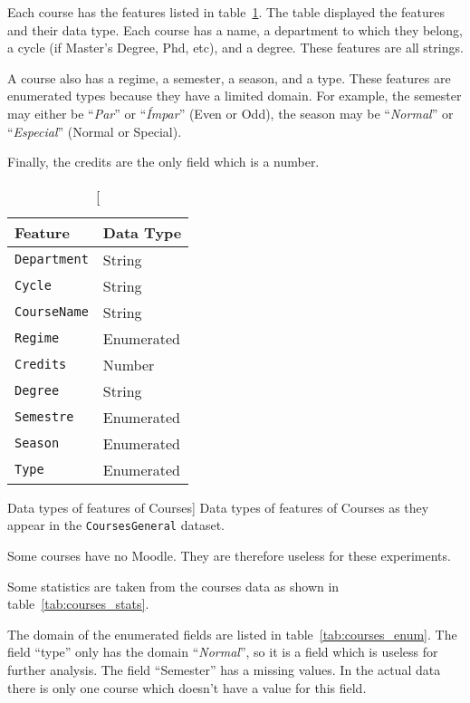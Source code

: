 Each course has the features listed in
table~\ref{tab:courses_general_features}. The table displayed the features and
their data type. Each course has a name, a department to which they belong, a
cycle (if Master's Degree, Phd, etc), and a degree. These features are all
strings.

A course also has a regime, a semester, a season, and a type. These features
are enumerated types because they have a limited domain. For example, the
semester may either be ``\textit{Par}'' or ``\textit{Ímpar}'' (Even or Odd),
the season may be ``\textit{Normal}'' or ``\textit{Especial}'' (Normal or
Special).

Finally, the credits are the only field which is a number.

\begin{table}[h!]
    \centering

    \begin{tabular}{l l}
        Feature             & Data Type  \\ \hline
        \texttt{Department} & String     \\
        \texttt{Cycle}      & String     \\
        \texttt{CourseName} & String     \\
        \texttt{Regime}     & Enumerated \\
        \texttt{Credits}    & Number     \\
        \texttt{Degree}     & String     \\
        \texttt{Semestre}   & Enumerated \\
        \texttt{Season}     & Enumerated \\
        \texttt{Type}       & Enumerated \\
    \end{tabular}

    \caption
        [Data types of features of Courses]
        {Data types of features of Courses as they appear in the
        \texttt{CoursesGeneral} dataset.}

    \label{tab:courses_general_features}
\end{table}

Some courses have no Moodle. They are therefore useless for these experiments.

Some statistics are taken from the courses data as shown in
table~\ref{tab:courses_stats}.

The domain of the enumerated fields are listed in table~\ref{tab:courses_enum}.
The field ``type'' only has the domain ``\textit{Normal}'', so it is a field
which is useless for further analysis. The field ``Semester'' has a missing
values. In the actual data there is only one course which doesn't have a value
for this field.

